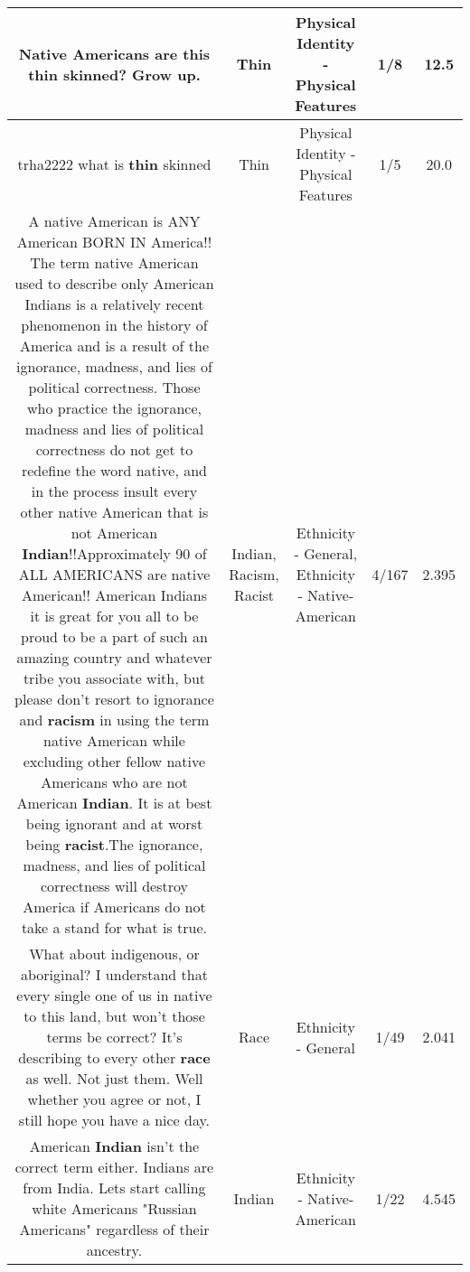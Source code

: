 \documentclass[11pt]{article}
\newlength\mylength
\begin{document}
\begin{center}
\begin{longtable}{|C{.65\mylength}|C{.30\mylength}|C{.12\mylength}|C{.12\mylength}|C{.12\mylength}|}
  \small Native Americans are this \textbf{thin} skinned? Grow up.\normalsize   & Thin & Physical Identity - Physical Features & 1/8 & 12.5 \\  \hline
  \small trha2222 what is \textbf{thin} skinned\normalsize   & Thin & Physical Identity - Physical Features & 1/5 & 20.0 \\  \hline
  \small A native American is ANY American BORN IN America!! The term native American used to describe only American Indians is a relatively recent phenomenon in the history of America and is a result of the ignorance, madness, and lies of political correctness. Those who practice the ignorance, madness and lies of political correctness do not get to redefine the word native, and in the process insult every other native American that is not American \textbf{Indian}!!Approximately 90 of ALL AMERICANS are native American!! American Indians it is great for you all to be proud to be a part of such an amazing country and whatever tribe you associate with, but please don't resort to ignorance and \textbf{racism} in using the term native American while excluding other fellow native Americans who are not American \textbf{Indian}. It is at best being ignorant and at worst being \textbf{racist}.The ignorance, madness, and lies of political correctness will destroy America if Americans do not take a stand for what is true.\normalsize   & Indian, Racism, Racist & Ethnicity - General, Ethnicity - Native-American & 4/167 & 2.395 \\  \hline
  \small What about indigenous, or aboriginal? I understand that every single one of us in native to this land, but won't those terms be correct? It's describing to every other \textbf{race} as well. Not just them. Well whether you agree or not, I still hope you have a nice day.\normalsize   & Race & Ethnicity - General & 1/49 & 2.041 \\  \hline
  \small American \textbf{Indian} isn't the correct term either. Indians are from India. Lets start calling white Americans "Russian Americans" regardless of their ancestry.\normalsize   & Indian & Ethnicity - Native-American & 1/22 & 4.545 \\  \hline

\end{longtable}
\end{center}
\end{document}
